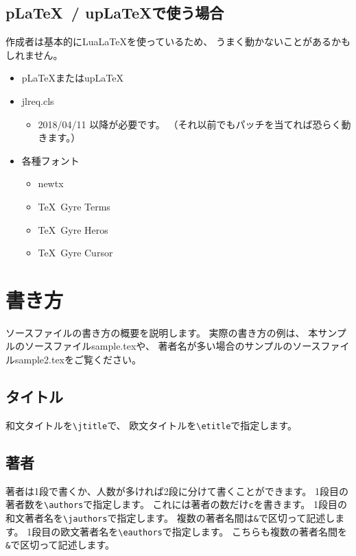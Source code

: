 \documentclass{FITpaper}
\begin{document}
\subsection{p\LaTeX~/ up\LaTeX で使う場合}

作成者は基本的にLua\LaTeX を使っているため、
うまく動かないことがあるかもしれません。

\begin{itemize}
\item p\LaTeX またはup\LaTeX
\item jlreq.cls
  \begin{itemize}
  \item 2018/04/11 以降が必要です。
    （それ以前でもパッチ\cite{column_gap}を当てれば恐らく動きます。）
  \end{itemize}
\item 各種フォント
  \begin{itemize}
  \item newtx
  \item \TeX~Gyre Terms
  \item \TeX~Gyre Heros
  \item \TeX~Gyre Cursor
  \end{itemize}
\end{itemize}

\section{書き方}

ソースファイルの書き方の概要を説明します。
実際の書き方の例は、
本サンプルのソースファイルsample.texや、
著者名が多い場合のサンプルのソースファイルsample2.texをご覧ください。

\subsection{タイトル}

和文タイトルを\texttt{\textbackslash jtitle}で、
欧文タイトルを\texttt{\textbackslash etitle}で指定します。

\subsection{著者}

著者は1段で書くか、人数が多ければ2段に分けて書くことができます。
1段目の著者数を\texttt{\textbackslash authors}で指定します。
これには著者の数だけ\texttt{c}を書きます。
1段目の和文著者名を\texttt{\textbackslash jauthors}で指定します。
複数の著者名間は\texttt{\&}で区切って記述します。
1段目の欧文著者名を\texttt{\textbackslash eauthors}で指定します。
こちらも複数の著者名間を\texttt{\&}で区切って記述します。
\end{document}
